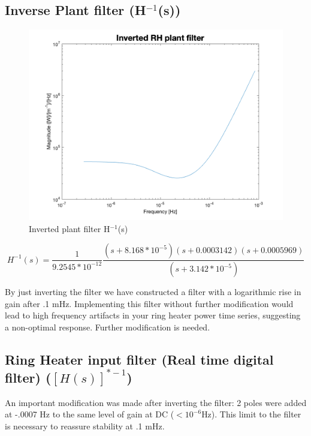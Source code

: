 \documentclass[colorlinks=true,pdfstartview=FitV,linkcolor=blue,
            citecolor=magenta,urlcolor=red]{ligodoc}
\begin{document}
\subsection{Inverse Plant filter (H$^{-1}$(s))}
\begin{figure}[H]
\includegraphics[page=2,width=\textwidth]{figures/matlab/inv_plant_filter.png}
\caption{Inverted plant filter H$^{-1}$(s)}
\label{fig:inv_plant_filt}
\end{figure}

$$ H^{-1}(s) = \frac{1}{9.2545*10^{-12}} \frac{(s+ 8.168*10^{-5}) (s+0.0003142) (s+0.0005969)}{(s+3.142*10^{-5})} $$

By just inverting the filter we have constructed a filter with a logarithmic rise in gain after .1 mHz. Implementing this filter without further modification would lead to high frequency artifacts in your ring heater power time series, suggesting a non-optimal response. Further modification is needed.



\subsection{Ring Heater input filter (Real time digital filter) ($[H(s)]^{*-1}$)}
An important modification was made after inverting the filter: 2 poles were added at -.0007 Hz to the same level of gain at DC ($<10^{-6}$Hz). This limit to the filter is necessary to reassure stability at .1 mHz.
\end{document}
